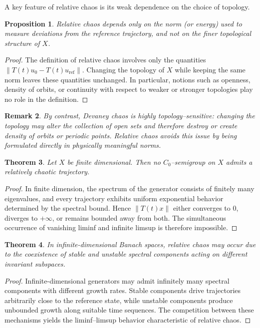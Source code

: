 \documentclass[12pt]{article}
\newtheorem{theorem}{Theorem}[section]
\newtheorem{proposition}[theorem]{Proposition}
\newtheorem{remark}[theorem]{Remark}
\begin{document}
A key feature of relative chaos is its weak dependence on the choice of topology.

\begin{proposition}\label{prop:normbased}
Relative chaos depends only on the norm (or energy) used to measure deviations from the reference trajectory, and not on the finer topological structure of $X$.
\end{proposition}

\begin{proof}
The definition of relative chaos involves only the quantities
$\|T(t)u_0-T(t)u_{\mathrm{ref}}\|$. Changing the topology of $X$ while keeping the same norm leaves these quantities unchanged. In particular, notions such as openness, density of orbits, or continuity with respect to weaker or stronger topologies play no role in the definition.
\end{proof}

\begin{remark}
By contrast, Devaney chaos is highly topology--sensitive: changing the topology may alter the collection of open sets and therefore destroy or create density of orbits or periodic points. Relative chaos avoids this issue by being formulated directly in physically meaningful norms.
\end{remark}

\begin{theorem}\label{thm:finite}
Let $X$ be finite dimensional. Then no $C_0$--semigroup on $X$ admits a relatively chaotic trajectory.
\end{theorem}

\begin{proof}
In finite dimension, the spectrum of the generator consists of finitely many eigenvalues, and every trajectory exhibits uniform exponential behavior determined by the spectral bound. Hence $\|T(t)x\|$ either converges to $0$, diverges to $+\infty$, or remains bounded away from both. The simultaneous occurrence of vanishing liminf and infinite limsup is therefore impossible.
\end{proof}

\begin{theorem}\label{thm:infinite}
In infinite-dimensional Banach spaces, relative chaos may occur due to the coexistence of stable and unstable spectral components acting on different invariant subspaces.
\end{theorem}

\begin{proof}
Infinite-dimensional generators may admit infinitely many spectral components with different growth rates. Stable components drive trajectories arbitrarily close to the reference state, while unstable components produce unbounded growth along suitable time sequences. The competition between these mechanisms yields the liminf--limsup behavior characteristic of relative chaos.
\end{proof}
\end{document}
